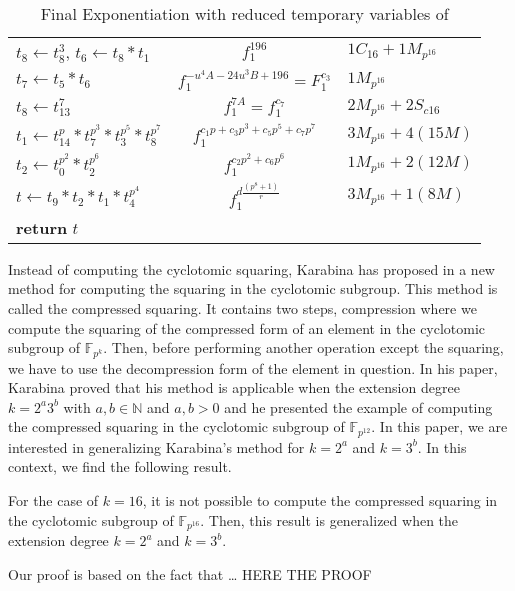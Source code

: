 \begin{center}
\begin{table}[!ht]
{\begin{tabular}{l|c|l}
			$t_{8} \leftarrow t_{8}^3$, $t_{6} \leftarrow t_{8}*t_{1}$&$f_1^{196}$&$1C_{16}+1M_{p^{16}}$\\
			$t_{7} \leftarrow t_{5}*t_{6}$&$f_1^{-u^4A-24u^3B+196}=F_1^{c_3}$&$1M_{p^{16}}$\\
			$t_{8} \leftarrow t_{13}^{7}$&$f_1^{7A}=f_1^{c_7}$&$2M_{p^{16}}+2S_{c16}$\\
			$t_{1} \leftarrow t_{14}^{p}* t_{7}^{p^3}* t_{3}^{p^5}* t_{8}^{p^7}$&$f_1^{c_1p+c_3p^3+c_5p^5+c_7p^7}$&$3M_{p^{16}}+4(15M)$\\
			$t_{2} \leftarrow t_{0}^{p^2}* t_{2}^{p^6}$&$f_1^{c_2p^2+c_6p^6}$&$1M_{p^{16}}+2(12M)$\\
			$t \leftarrow t_{9}*t_{2}*t_{1}*t_{4}^{p^4}$&$f_1^{d{\frac{(p^8+1)}{r}}}$&$3M_{p^{16}}+1(8M)$\\
			\textbf{return} $t$ & &\\
			\hline
		\end{tabular}
		}
		\caption{Final Exponentiation with reduced temporary variables of \cite{EPRINT:GhaFou16b}}
		\label{algo_final}
	\end{table}
\end{center}
\vspace{8mm}


Instead of computing the cyclotomic squaring, Karabina has proposed in \cite{Karabina13Squaring} a new method for computing the squaring in the cyclotomic subgroup. This method is called the compressed squaring. It contains two steps, compression where we compute the squaring of the compressed form of an element in the cyclotomic subgroup of $\mathbb{F}_{p^k}$. Then, before performing another operation except the squaring, we have to use the decompression form of the element in question.
In his paper, Karabina proved that his method is applicable when the extension degree $k=2^a3^b$ with $a, b \in \mathbb{N}$ and  $a, b>0$ and he presented the example of computing the compressed squaring in the cyclotomic subgroup of $\mathbb{F}_{p^{12}}$.
In this paper, we are interested in generalizing Karabina's method for  $k=2^a$ and $k=3^b$. In this context, we find the following result.
\begin{prop}
For the case of $k=16$, it is not possible to compute the compressed squaring in the cyclotomic subgroup of $\mathbb{F}_{p^{16}}$. Then, this result is generalized when the extension degree $k=2^a$ and $k=3^b$.
\end{prop}
Our proof is based on the fact that \dots 
HERE THE PROOF\\

